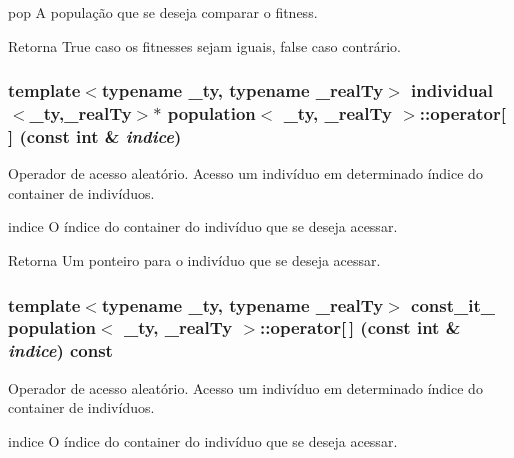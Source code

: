 pop A população que se deseja comparar o fitness.

\begin{DoxyReturn}{Retorna}
True caso os fitnesses sejam iguais, false caso contrário. 
\end{DoxyReturn}
\hypertarget{classpopulation_a14c45c3fe1905bcb673919ae251087a9}{
\subsubsection[{operator[]}]{\setlength{\rightskip}{0pt plus 5cm}template$<$typename \_\-ty, typename \_\-realTy$>$ {\bf individual}$<$\_\-ty,\_\-realTy$>$$\ast$ {\bf population}$<$ \_\-ty, \_\-realTy $>$::operator\mbox{[}$\,$\mbox{]} (const int \& {\em indice})}}
\label{classpopulation_a14c45c3fe1905bcb673919ae251087a9}
Operador de acesso aleatório. Acesso um indivíduo em determinado índice do container de indivíduos.

indice O índice do container do indivíduo que se deseja acessar.

\begin{DoxyReturn}{Retorna}
Um ponteiro para o indivíduo que se deseja acessar. 
\end{DoxyReturn}
\hypertarget{classpopulation_a6ca81f5193818b065f792fac9b51f6e3}{
\subsubsection[{operator[]}]{\setlength{\rightskip}{0pt plus 5cm}template$<$typename \_\-ty, typename \_\-realTy$>$ {\bf const\_\-it\_\-} {\bf population}$<$ \_\-ty, \_\-realTy $>$::operator\mbox{[}$\,$\mbox{]} (const int \& {\em indice}) const}}
\label{classpopulation_a6ca81f5193818b065f792fac9b51f6e3}
Operador de acesso aleatório. Acesso um indivíduo em determinado índice do container de indivíduos.

indice O índice do container do indivíduo que se deseja acessar.

